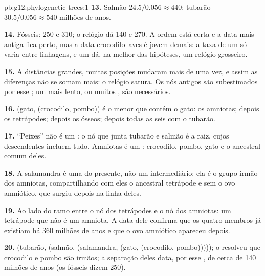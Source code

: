 \begin{solution}{pb:g12:phylogenetic-trees:1}
\textbf{13.} Salmão $24.5/0.056 \approx 440$; tubarão $30.5/0.056
\approx 540$ milhões de anos.

\textbf{14.} Fósseis: 250 e 310; o relógio dá 140 e 270. A ordem está
certa e a data mais antiga fica perto, mas a data crocodilo--aves é
jovem demais: a taxa de um  só varia entre linhagens, e um  dá,
na melhor das hipóteses, um relógio grosseiro.

\textbf{15.} A distâncias grandes, muitas posições mudaram mais de uma
vez, e assim as diferenças não se somam mais: o relógio satura. Os nós
antigos são subestimados por esse ; um  mais lento, ou muitos
, são necessários.

\textbf{16.} (gato, (crocodilo, pombo)) é o menor  que contém o
gato: os amniotas; depois os tetrápodes; depois os  ósseos;
depois todas as seis com o tubarão.

\textbf{17.} ``Peixes'' não é um : o nó que junta tubarão e salmão
é a raiz, cujos descendentes incluem tudo. Amniotas é um :
crocodilo, pombo, gato e o ancestral comum deles.

\textbf{18.} A salamandra é uma  do presente, não um
intermediário; ela é o grupo-irmão dos amniotas, compartilhando com
eles o ancestral tetrápode e sem o ovo amniótico, que surgiu depois na
linha deles.

\textbf{19.} Ao lado do ramo entre o nó dos tetrápodes e o nó dos
amniotas: um tetrápode que não é um amniota. A data dele confirma que
os quatro membros já existiam há 360 milhões de anos e que o ovo
amniótico apareceu depois.

\textbf{20.} (tubarão, (salmão, (salamandra, (gato, (crocodilo,
pombo))))); o  resolveu que crocodilo e pombo são irmãos; a
separação deles data, por esse , de cerca de 140 milhões de anos
(os fósseis dizem 250).
\end{solution}
